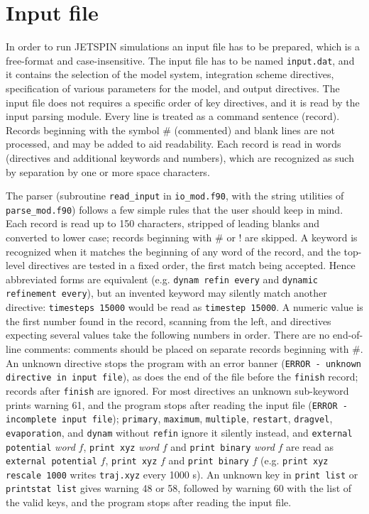 \section{Input file\label{sec:Input-file}}

In order to run JETSPIN simulations an input file has to be prepared,
which is a free-format and case-insensitive. The input file has to
be named \texttt{input.dat}, and it contains the selection of the
model system, integration scheme directives, specification of various
parameters for the model, and output directives. The input file does
not requires a specific order of key directives, and it is read by
the input parsing module. Every line is treated as a command sentence
(record). Records beginning with the symbol \# (commented) and blank
lines are not processed, and may be added to aid readability. Each
record is read in words (directives and additional keywords and numbers),
which are recognized as such by separation by one or more space characters.

The parser (subroutine \texttt{read\_input} in \texttt{io\_mod.f90}, with the
string utilities of \texttt{parse\_mod.f90}) follows a few simple rules that
the user should keep in mind. Each record is read up to 150 characters,
stripped of leading blanks and converted to lower case; records beginning
with \# or ! are skipped. A keyword is recognized when it matches the
beginning of any word of the record, and the top-level directives are tested
in a fixed order, the first match being accepted. Hence abbreviated forms are
equivalent (e.g. \texttt{dynam refin every} and
\texttt{dynamic refinement every}), but an invented keyword may silently match
another directive: \texttt{timesteps 15000} would be read as
\texttt{timestep 15000}. A numeric value is the first number found in the
record, scanning from the left, and directives expecting several values take
the following numbers in order. There are no end-of-line comments: comments
should be placed on separate records beginning with \#. An unknown directive
stops the program with an error banner (\texttt{ERROR - unknown directive
in input file}), as does the end of the file before the \texttt{finish}
record; records after \texttt{finish} are ignored. For most directives an
unknown sub-keyword prints warning 61, and the program stops after reading
the input file (\texttt{ERROR - incomplete input file}); \texttt{primary},
\texttt{maximum}, \texttt{multiple}, \texttt{restart}, \texttt{dragvel},
\texttt{evaporation}, and \texttt{dynam} without \texttt{refin} ignore it
silently instead, and \texttt{external potential} \textit{word} $f$,
\texttt{print xyz} \textit{word} $f$ and \texttt{print binary} \textit{word}
$f$ are read as \texttt{external potential} $f$, \texttt{print xyz} $f$ and
\texttt{print binary} $f$ (e.g. \texttt{print xyz rescale 1000} writes
\texttt{traj.xyz} every 1000 s). An unknown key in \texttt{print list} or
\texttt{printstat list} gives warning 48 or 58, followed by warning 60 with
the list of the valid keys, and the program stops after reading the input
file.

